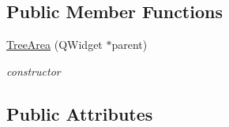 \subsection*{\-Public \-Member \-Functions}
\begin{DoxyCompactItemize}
\item 
\hyperlink{class_tree_area_a83e789309721c85ff2f431c789c641ec}{\-Tree\-Area} (\-Q\-Widget $\ast$parent)
\begin{DoxyCompactList}\small\item\em constructor \end{DoxyCompactList}\end{DoxyCompactItemize}
\subsection*{\-Public \-Attributes}
